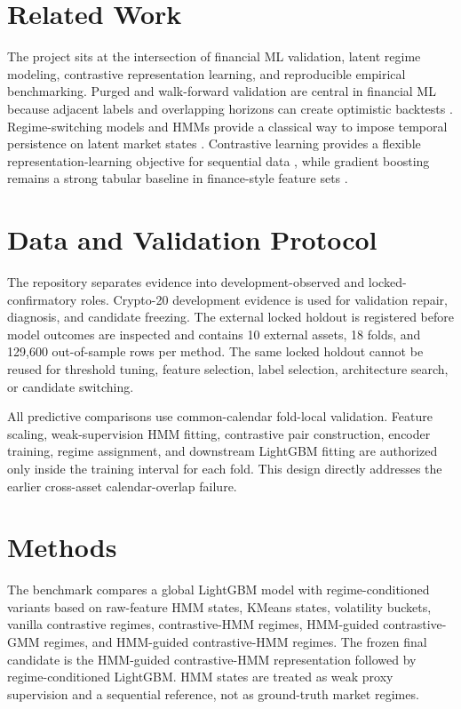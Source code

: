 \documentclass[sigconf,anonymous,review]{acmart}
\begin{document}
\section{Related Work}
The project sits at the intersection of financial ML validation, latent regime modeling, contrastive representation learning, and reproducible empirical benchmarking. Purged and walk-forward validation are central in financial ML because adjacent labels and overlapping horizons can create optimistic backtests \cite{lopezdeprado2018afml}. Regime-switching models and HMMs provide a classical way to impose temporal persistence on latent market states \cite{hamilton1989regime,rabiner1989hmm}. Contrastive learning provides a flexible representation-learning objective for sequential data \cite{oord2018cpc,chen2020simclr}, while gradient boosting remains a strong tabular baseline in finance-style feature sets \cite{lightgbm2017}.

\section{Data and Validation Protocol}
The repository separates evidence into development-observed and locked-confirmatory roles. Crypto-20 development evidence is used for validation repair, diagnosis, and candidate freezing. The external locked holdout is registered before model outcomes are inspected and contains 10 external assets, 18 folds, and 129,600 out-of-sample rows per method. The same locked holdout cannot be reused for threshold tuning, feature selection, label selection, architecture search, or candidate switching.

All predictive comparisons use common-calendar fold-local validation. Feature scaling, weak-supervision HMM fitting, contrastive pair construction, encoder training, regime assignment, and downstream LightGBM fitting are authorized only inside the training interval for each fold. This design directly addresses the earlier cross-asset calendar-overlap failure.

\section{Methods}
The benchmark compares a global LightGBM model with regime-conditioned variants based on raw-feature HMM states, KMeans states, volatility buckets, vanilla contrastive regimes, contrastive-HMM regimes, HMM-guided contrastive-GMM regimes, and HMM-guided contrastive-HMM regimes. The frozen final candidate is the HMM-guided contrastive-HMM representation followed by regime-conditioned LightGBM. HMM states are treated as weak proxy supervision and a sequential reference, not as ground-truth market regimes.
\end{document}

